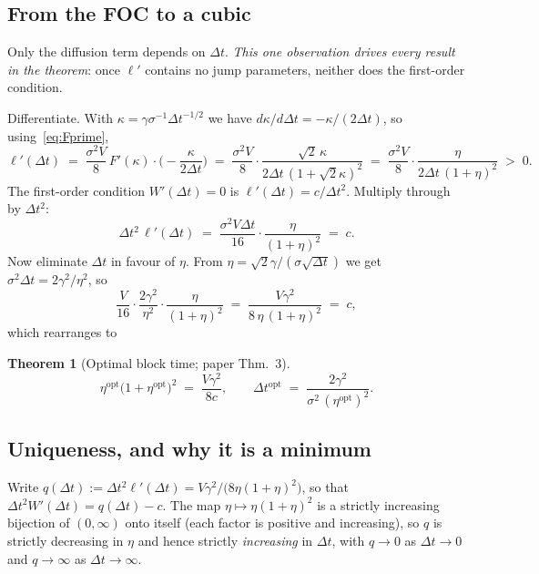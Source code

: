 \documentclass[11pt]{article}
\newtheorem{theorem}{Theorem}
\theoremstyle{definition}
\theoremstyle{remark}
\newcommand{\dt}{\Delta t}
\newcommand{\1}{\mathbf{1}}
\begin{document}
\subsection{From the FOC to a cubic}

Only the diffusion term depends on $\dt$. \emph{This one observation drives every result in the theorem}: once $\ell'$ contains no jump parameters, neither does the first-order condition.

Differentiate. With $\kappa = \gamma\sigma^{-1}\dt^{-1/2}$ we have $d\kappa/d\dt = -\kappa/(2\dt)$, so using~\eqref{eq:Fprime},
\begin{equation}\label{eq:ellprime}
\ell'(\dt) \;=\; \frac{\sigma^2V}{8}\,F'(\kappa)\cdot\Big(-\frac{\kappa}{2\dt}\Big)
\;=\; \frac{\sigma^2V}{8}\cdot\frac{\sqrt2\,\kappa}{2\dt\,(1+\sqrt2\kappa)^2}
\;=\; \frac{\sigma^2V}{8}\cdot\frac{\eta}{2\dt\,(1+\eta)^2} \;>\; 0 .
\end{equation}
The first-order condition $W'(\dt) = 0$ is $\ell'(\dt) = c/\dt^2$. Multiply through by $\dt^2$:
\[
\dt^2\,\ell'(\dt) \;=\; \frac{\sigma^2 V\dt}{16}\cdot\frac{\eta}{(1+\eta)^2} \;=\; c .
\]
Now eliminate $\dt$ in favour of $\eta$. From $\eta = \sqrt2\gamma/(\sigma\sqrt{\dt})$ we get $\sigma^2\dt = 2\gamma^2/\eta^2$, so
\[
\frac{V}{16}\cdot\frac{2\gamma^2}{\eta^2}\cdot\frac{\eta}{(1+\eta)^2}
\;=\; \frac{V\gamma^2}{8\,\eta\,(1+\eta)^2} \;=\; c,
\]
which rearranges to

\begin{theorem}[Optimal block time; paper Thm.~3]\label{thm:planner}
\begin{equation}\label{eq:cubic}
\boxed{\;\eta^{\mathrm{opt}}\big(1+\eta^{\mathrm{opt}}\big)^2 \;=\; \frac{V\gamma^2}{8c},
\qquad
\dt^{\mathrm{opt}} \;=\; \frac{2\gamma^2}{\sigma^2\,(\eta^{\mathrm{opt}})^2}. \;}
\end{equation}
\end{theorem}

\subsection{Uniqueness, and why it is a minimum}

Write $q(\dt) := \dt^2\ell'(\dt) = V\gamma^2/\big(8\eta(1+\eta)^2\big)$, so that $\dt^2W'(\dt) = q(\dt) - c$. The map $\eta \mapsto \eta(1+\eta)^2$ is a strictly increasing bijection of $(0,\infty)$ onto itself (each factor is positive and increasing), so $q$ is strictly decreasing in $\eta$ and hence strictly \emph{increasing} in $\dt$, with $q \to 0$ as $\dt\to0$ and $q\to\infty$ as $\dt\to\infty$.
\end{document}
